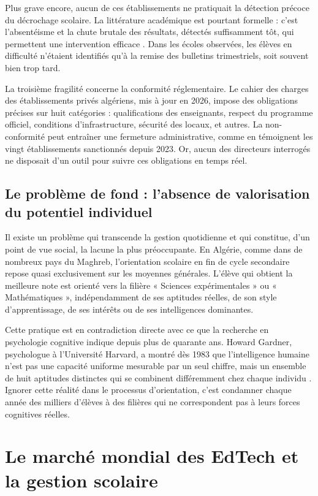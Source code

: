 \documentclass[12pt,a4paper,oneside]{report}
\begin{document}
Plus grave encore, aucun de ces établissements ne pratiquait la détection précoce du décrochage scolaire. La littérature académique est pourtant formelle : c'est l'absentéisme et la chute brutale des résultats, détectés suffisamment tôt, qui permettent une intervention efficace \autocite{balfanz2007preventing}. Dans les écoles observées, les élèves en difficulté n'étaient identifiés qu'à la remise des bulletins trimestriels, soit souvent bien trop tard.

La troisième fragilité concerne la conformité réglementaire. Le cahier des charges des établissements privés algériens, mis à jour en 2026, impose des obligations précises sur huit catégories : qualifications des enseignants, respect du programme officiel, conditions d'infrastructure, sécurité des locaux, et autres. La non-conformité peut entraîner une fermeture administrative, comme en témoignent les vingt établissements sanctionnés depuis 2023. Or, aucun des directeurs interrogés ne disposait d'un outil pour suivre ces obligations en temps réel.

\subsection{Le problème de fond : l'absence de valorisation du potentiel individuel}

Il existe un problème qui transcende la gestion quotidienne et qui constitue, d'un point de vue social, la lacune la plus préoccupante. En Algérie, comme dans de nombreux pays du Maghreb, l'orientation scolaire en fin de cycle secondaire repose quasi exclusivement sur les moyennes générales. L'élève qui obtient la meilleure note est orienté vers la filière « Sciences expérimentales » ou « Mathématiques », indépendamment de ses aptitudes réelles, de son style d'apprentissage, de ses intérêts ou de ses intelligences dominantes.

Cette pratique est en contradiction directe avec ce que la recherche en psychologie cognitive indique depuis plus de quarante ans. Howard Gardner, psychologue à l'Université Harvard, a montré dès 1983 que l'intelligence humaine n'est pas une capacité uniforme mesurable par un seul chiffre, mais un ensemble de huit aptitudes distinctes qui se combinent différemment chez chaque individu \autocite{gardner1983frames}. Ignorer cette réalité dans le processus d'orientation, c'est condamner chaque année des milliers d'élèves à des filières qui ne correspondent pas à leurs forces cognitives réelles.

\section{Le marché mondial des EdTech et la gestion scolaire}
\end{document}
